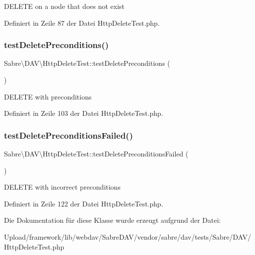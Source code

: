 D\+E\+L\+E\+TE on a node that does not exist 

Definiert in Zeile 87 der Datei Http\+Delete\+Test.\+php.

\mbox{\label{class_sabre_1_1_d_a_v_1_1_http_delete_test_aeccedea7f846eb0a01ddf8aec3fff150}} 
\subsubsection{\texorpdfstring{test\+Delete\+Preconditions()}{testDeletePreconditions()}}
{\footnotesize\ttfamily Sabre\textbackslash{}\+D\+A\+V\textbackslash{}\+Http\+Delete\+Test\+::test\+Delete\+Preconditions (\begin{DoxyParamCaption}{ }\end{DoxyParamCaption})}

D\+E\+L\+E\+TE with preconditions 

Definiert in Zeile 103 der Datei Http\+Delete\+Test.\+php.

\mbox{\label{class_sabre_1_1_d_a_v_1_1_http_delete_test_a6a92cfa39b3a12b1699b69f2a5251a38}} 
\subsubsection{\texorpdfstring{test\+Delete\+Preconditions\+Failed()}{testDeletePreconditionsFailed()}}
{\footnotesize\ttfamily Sabre\textbackslash{}\+D\+A\+V\textbackslash{}\+Http\+Delete\+Test\+::test\+Delete\+Preconditions\+Failed (\begin{DoxyParamCaption}{ }\end{DoxyParamCaption})}

D\+E\+L\+E\+TE with incorrect preconditions 

Definiert in Zeile 122 der Datei Http\+Delete\+Test.\+php.



Die Dokumentation für diese Klasse wurde erzeugt aufgrund der Datei\+:\begin{DoxyCompactItemize}
\item 
Upload/framework/lib/webdav/\+Sabre\+D\+A\+V/vendor/sabre/dav/tests/\+Sabre/\+D\+A\+V/Http\+Delete\+Test.\+php\end{DoxyCompactItemize}
